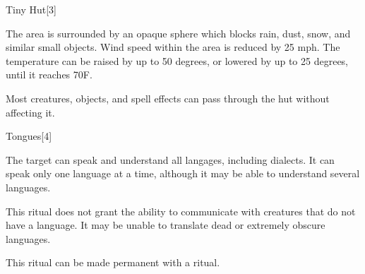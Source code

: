 \begin{spellsection}{Tiny Hut}[3]
    \begin{spellheader}
    \end{spellheader}
    \begin{spellcontent}
        \begin{spelltargetinginfo}
        \end{spelltargetinginfo}
        \begin{spelleffects}

            \spellline
            \spelleffect The area is surrounded by an opaque sphere which blocks rain, dust, snow, and similar small objects. Wind speed within the area is reduced by 25 mph. The temperature can be raised by up to 50 degrees, or lowered by up to 25 degrees, until it reaches 70\degree F.
            \spelldur \durext \dismissable
        \end{spelleffects}
    \end{spellcontent}
    \begin{spellfooter}
        \spellnotes Most creatures, objects, and spell effects can pass through the hut without affecting it.
    \end{spellfooter}
\end{spellsection}

\begin{spellsection}{Tongues}[4]
    \begin{spellheader}
    \end{spellheader}
    \begin{spellcontent}
        \begin{spelltargetinginfo}
        \end{spelltargetinginfo}
        \begin{spelleffects}

            \spelleffect The target can speak and understand all langages, including dialects. It can speak only one language at a time, although it may be able to understand several languages.
            \spelldur \durlong
        \end{spelleffects}
    \end{spellcontent}
    \begin{spellfooter}
        \spellnotes This ritual does not grant the ability to communicate with creatures that do not have a language. It may be unable to translate dead or extremely obscure languages.

        This ritual can be made permanent with a  ritual.
    \end{spellfooter}
\end{spellsection}

